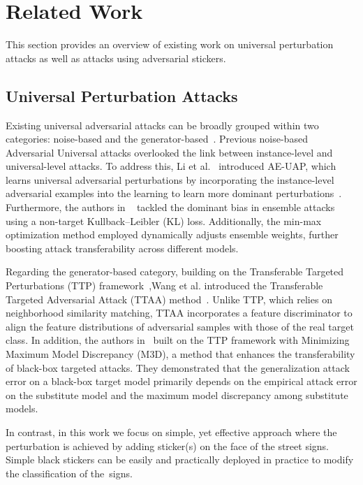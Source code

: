 \section{Related Work}
\label{sec:related_work}

This section provides an overview of existing work on universal perturbation attacks as well as attacks using adversarial stickers.

\subsection{Universal Perturbation Attacks}

Existing universal adversarial attacks can be broadly grouped within two categories: noise-based 
and the generator-based~\cite{weng2024comparative}.
Previous noise-based Adversarial Universal attacks overlooked the link between instance-level and universal-level attacks. To address this, Li et al.~\cite{Li_Yang_Wei_Yang_Huang_2022} introduced AE-UAP, which learns universal adversarial perturbations by incorporating the instance-level adversarial examples into the learning to learn more dominant perturbations~\cite{weng2024comparative}. Furthermore, the authors in ~\cite{Weng_Luo_Zhong_Lin_Li_2023} tackled the dominant bias in ensemble attacks using a non-target Kullback–Leibler (KL) loss. Additionally, the min-max optimization method employed dynamically adjusts ensemble weights, further boosting attack transferability across different models.

Regarding the generator-based category, building on the Transferable Targeted Perturbations (TTP) framework~\cite{naseer2021generating},Wang et al. introduced the Transferable Targeted Adversarial Attack (TTAA) method~\cite{10204634}. Unlike TTP, which relies on neighborhood similarity matching, TTAA incorporates a feature discriminator to align the feature distributions of adversarial samples with those of the real target class. 
In addition, the authors in~\cite{10205119} built on the TTP framework with Minimizing Maximum Model Discrepancy (M3D), a method that enhances the transferability of black-box targeted attacks. They demonstrated that the generalization attack error on a black-box target model primarily depends on the empirical attack error on the substitute model and the maximum model discrepancy among substitute models.

In contrast, in this work we focus on simple, yet effective approach where the perturbation is achieved by adding sticker(s) on the face of the street signs. Simple black stickers can be easily and practically deployed in practice to modify the classification of the~signs.

